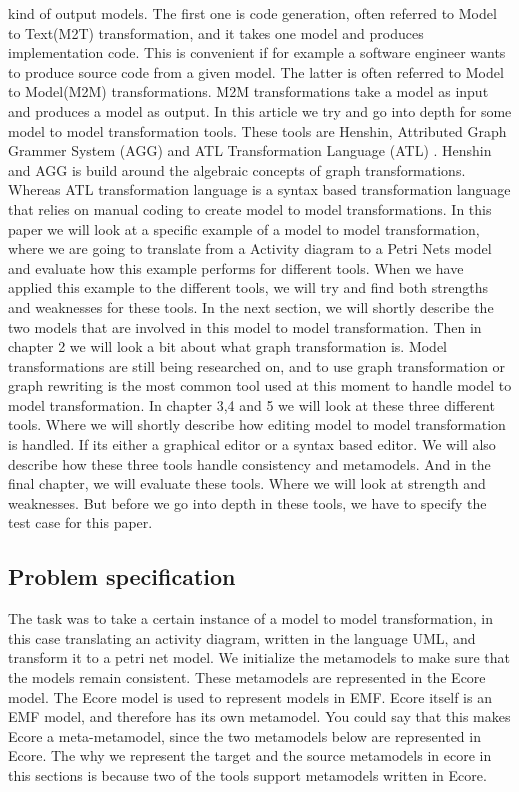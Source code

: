 \documentclass[pdftex,11pt,a4paper]{article}
\begin{document}
kind of output models. The first one is code generation, often referred to
Model to Text(M2T) transformation, and it takes one model and produces
implementation code. This is convenient if for example a software engineer
wants to produce source code from a given model. The latter is often referred
to Model to Model(M2M) transformations. M2M transformations take a model as
input and produces a model as output. In this article we try and go into depth
for some model to model transformation tools. These tools are
Henshin\cite{Henshin}, Attributed Graph Grammer System (AGG) \cite{AGG} and
ATL Transformation Language (ATL) \cite{ATL}. Henshin and AGG is build around
the algebraic concepts of graph transformations. Whereas ATL transformation
language is a syntax based transformation language that relies on manual coding
to create model to model transformations. In this paper we will look at a
specific example of a model to model transformation, where we are going to
translate from a Activity diagram to a Petri Nets model and evaluate how this
example performs for different tools. When we have applied this example to the
different tools, we will try and find both strengths and weaknesses for these
tools. In the next section, we will shortly describe the two models that are
involved in this model to model transformation. Then in chapter 2 we will look a
bit about what graph transformation is. Model transformations are still being
researched on, and to use graph transformation or graph rewriting is the
most common tool used at this moment to handle model to model transformation.
In chapter 3,4 and 5 we will look at these three different tools. Where we will
shortly describe how editing model to model transformation is handled. If its
either a graphical editor or a syntax based editor. We will also describe how
these three tools handle consistency and metamodels. And in the final chapter,
we will evaluate these tools. Where we will look at strength and weaknesses. But
before we go into depth in these tools, we have to specify the test case for
this paper.

\subsection{Problem specification}
\noindent The task was to take a certain instance of a model to model
transformation, in this case translating an activity diagram, written in the
language UML, and transform it to a petri net model. We initialize the
metamodels to make sure that the models remain consistent. These metamodels are
represented in the Ecore model\cite{Steinberg2009}. The Ecore model is used to
represent models in EMF. Ecore itself is an EMF model, and therefore has its own
metamodel. You could say that this makes Ecore a meta-metamodel, since the two
metamodels below are represented in Ecore. The why we represent the target and
the source metamodels in ecore in this sections is because two of the tools
support metamodels written in Ecore.
\end{document}
